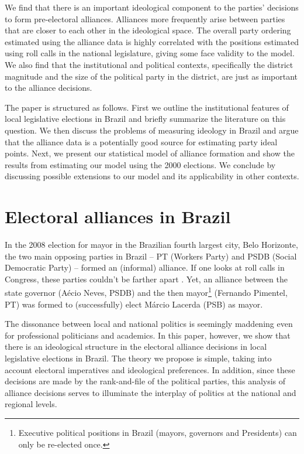 We find that there is an important ideological component to the parties' decisions to form pre-electoral alliances. Alliances more frequently arise between parties that are closer to each other in the ideological space. The overall party ordering estimated using the alliance data is highly correlated with the positions estimated using roll calls in the national legislature, giving some face validity to the model.  We also find that the institutional and political contexts, specifically the district magnitude and the size of the political party in the district, are just as important to the alliance decisions. 

The paper is structured as follows. First we outline the institutional features of local legislative elections in Brazil and briefly summarize the literature on this question. We then discuss the problems  of measuring ideology in Brazil and argue that the alliance data is a potentially good source for estimating party ideal points. Next, we present our statistical model of alliance formation and show the results from estimating our model using the 2000 elections. We  conclude by discussing possible  extensions to our model and its applicability in other contexts.

\section{Electoral alliances in Brazil}
\label{sec:measuring-ideology}


In the 2008 election for mayor in the Brazilian fourth largest city, Belo Horizonte, the two main opposing parties in Brazil -- PT (Workers Party) and PSDB (Social Democratic Party) -- formed an (informal) alliance.  If one looks at roll calls in Congress, these parties couldn't be farther apart \citep{leoni:2002}. Yet, an alliance between the state governor (Aécio Neves, PSDB) and the then mayor\footnote{Executive political positions in Brazil (mayors, governors and Presidents) can only be re-elected once.} (Fernando Pimentel, PT) was formed to (successfully) elect Márcio Lacerda (PSB) as mayor. 

The dissonance between local and national politics is seemingly maddening even for professional politicians and academics. In this paper, however, we show that there is an ideological structure in the electoral alliance decisions in local legislative elections in Brazil.  The theory we propose is simple, taking into account electoral imperatives and ideological preferences. In addition, since these decisions are made by the rank-and-file of the political parties, this analysis of alliance decisions serves to illuminate the interplay of politics at the national and regional levels. 

